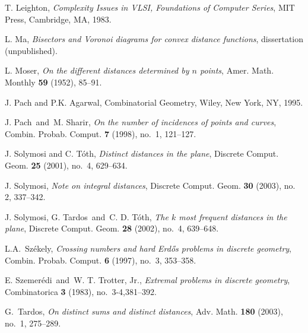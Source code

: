 \documentclass[]{amsart}
\numberwithin{equation}{section}
\theoremstyle{plain}
\theoremstyle{definition}
\theoremstyle{remark}
\begin{document}
\begin{thebibliography}{55}


 T. Leighton, {\it Complexity Issues in VLSI, Foundations of Computer Series}, MIT Press, Cambridge, MA, 1983.

 L. Ma, {\it Bisectors and Voronoi diagrams for convex distance functions}, dissertation (unpublished).

 L. Moser, {\it On the different distances determined by $n$ points}, Amer. Math. Monthly {\bf 59} (1952), 85--91.

 J. Pach and P.K. Agarwal, {Combinatorial Geometry}, Wiley, New York, NY, 1995.

 J. Pach\ and\ M. Sharir, {\it On the number of incidences of points and curves}, Combin. Probab. Comput. {\bf 7} (1998), no.~1, 121--127.

 J. Solymosi and C. T\'{o}th, {\it Distinct distances in the plane}, Discrete Comput. Geom. {\bf 25} (2001), no.~4, 629--634.

 J. Solymosi, {\it Note on integral distances},
Discrete Comput. Geom.  {\bf 30}  (2003),  no. 2, 337--342.

 J. Solymosi, G. Tardos\ and\ C. D. T\'oth, \emph{The $k$ most frequent distances in the plane}, Discrete Comput. Geom. \textbf{28} (2002), no.~4, 639--648.




 L.A.~Sz\'{e}kely, {\it Crossing numbers and hard Erd\H{o}s problems in discrete geometry},
Combin. Probab. Comput. {\bf 6} (1997), no.~3, 353--358.

 E. Szemer\'edi\ and\ W. T. Trotter, Jr.,
{\it Extremal problems in discrete geometry}, Combinatorica {\bf 3}
(1983), no.~3-4,381--392.

 G.~Tardos, {\it On distinct sums and distinct distances}, Adv. Math. {\bf 180} (2003), no.~1, 275--289.

\end{thebibliography}
\end{document}
